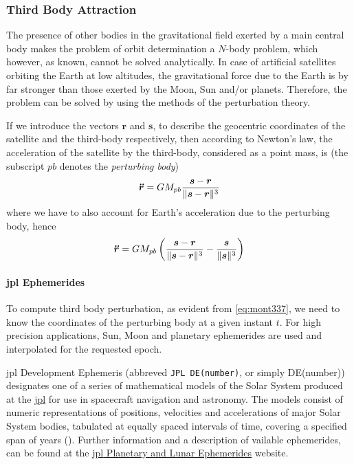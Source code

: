 \subsubsection{Third Body Attraction}\label{sssec:third-body-perturbations}

The presence of other bodies in the gravitational ﬁeld exerted by a main central
body makes the problem of orbit determination a $N$-body problem, which however, as known, 
cannot be solved analytically. In case of artiﬁcial satellites orbiting the Earth 
at low altitudes, the gravitational force due to the Earth is by far stronger than 
those exerted by the Moon, Sun and/or planets. Therefore, the problem can be solved 
by using the methods of the perturbation theory.

If we introduce the vectors $\bm{r}$ and $\bm{s}$, to describe the geocentric 
coordinates of the satellite and the third-body respectively, then according to 
Newton's law, the acceleration of the satellite by the third-body, considered as 
a point mass, is (the subscript $pb$ denotes the \emph{perturbing body})
\begin{equation}
    \bm{\ddot{r}} = GM_{pb} \frac{\bm{s}-\bm{r}}
        {\lVert\bm{s}-\bm{r}\rVert^3}
\end{equation}
where we have to also account for Earth's acceleration due to the perturbing body, 
hence
\begin{equation}\label{eq:mont337}
    \bm{\ddot{r}} = GM_{pb} \left( 
        \frac{\bm{s}-\bm{r}}{\lVert\bm{s}-\bm{r}\rVert^3} 
        - \frac{\bm{s}}{\lVert\bm{s}\rVert^3} \right)
\end{equation}


\paragraph{\gls{jpl} Ephemerides}\label{par:jpl-ephemerides}

To compute third body perturbation, as evident from \ref{eq:mont337}, we need to 
know the coordinates of the perturbing body at a given instant $t$. For high 
precision applications, Sun, Moon and planetary ephemerides are used and interpolated 
for the requested epoch.

\gls{jpl} Development Ephemeris (abbreved \texttt{JPL DE(number)}, or simply DE(number)) 
designates one of a series of mathematical models of the Solar System produced at the 
\href{https://www.jpl.nasa.gov/}{\gls{jpl}} for use in spacecraft navigation and astronomy. 
The models consist of numeric representations of positions, velocities and accelerations 
of major Solar System bodies, tabulated at equally spaced intervals of time, covering 
a specified span of years (\cite{wiki-jplde}). Further information and a description of 
vailable ephemerides, can be found at the 
\href{https://ssd.jpl.nasa.gov/planets/eph_export.html}{\gls{jpl} Planetary and Lunar Ephemerides} 
website.

